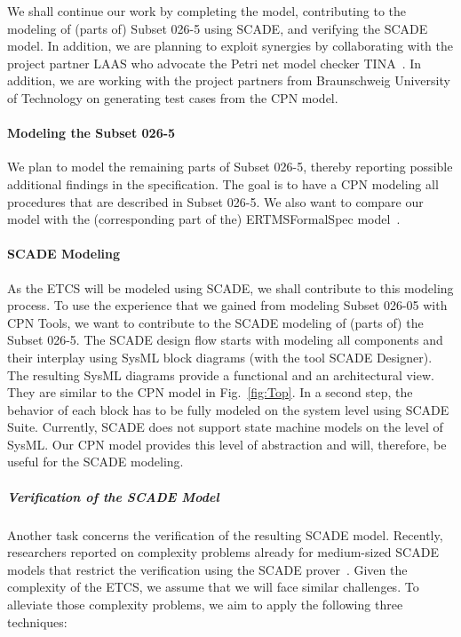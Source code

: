 We shall continue our work by completing the model, contributing to the modeling of (parts of) Subset 026-5 using SCADE, and verifying the SCADE model. In addition, we are planning to exploit synergies by collaborating with the project partner LAAS who advocate the Petri net model checker TINA~\cite{BerthomieuV2006}. In addition, we are working with the project partners from Braunschweig University of Technology on generating test cases from the CPN model.


\paragraph{Modeling the Subset 026-5}

We plan to model the remaining parts of Subset 026-5, thereby reporting possible additional findings in the specification. The goal is to have a CPN modeling all procedures that are described in Subset 026-5. We also want to compare our model with the (corresponding part of the) ERTMSFormalSpec model~\cite{ertms}.


\paragraph{SCADE Modeling}

As the ETCS will be modeled using SCADE, we shall contribute to this modeling process. To use the experience that we gained from modeling Subset 026-05 with CPN Tools, we want to contribute to the SCADE modeling of (parts of) the Subset 026-5. The SCADE design flow starts with modeling all components and their interplay using SysML block diagrams (with the tool SCADE Designer). The resulting SysML diagrams provide a functional and an architectural view. They are similar to the CPN model in Fig.~\ref{fig:Top}. In a second step, the behavior of each block has to be fully modeled on the system level using SCADE Suite. Currently, SCADE does not support state machine models on the level of SysML. Our CPN model provides this level of abstraction and will, therefore, be useful for the SCADE modeling.


\subparagraph{Verification of the SCADE Model}

Another task concerns the verification of the resulting SCADE model. Recently, researchers reported on complexity problems already for medium-sized SCADE models that restrict the verification using the SCADE prover~\cite{HuhnM2014scp,DaskayaHM2011fmics}. Given the complexity of the ETCS, we assume that we will face similar challenges. To alleviate those complexity problems, we aim to apply the following three techniques:

